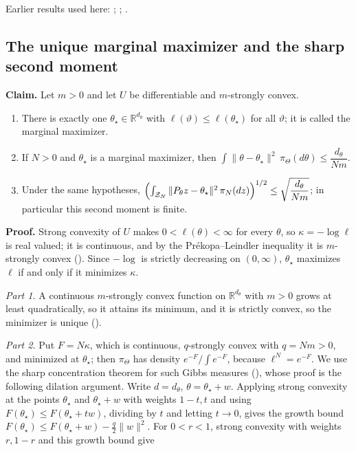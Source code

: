 \documentclass[11pt,a4paper]{report}
\begin{document}
Earlier results used here: \cite[Section~3.1.1]{LangevinLean2026IPLA}; \cite[Section~3.1.6]{LangevinLean2026IPLA}; \cite[Section~3.9.9]{LangevinLean2026IPLA}.
\subsection{\texorpdfstring{The unique marginal maximizer and the sharp second moment}{The unique marginal maximizer and the sharp second moment}}
\label{report-step-KIPLMC-Target-lean-4}


\textbf{Claim.} Let \(m>0\) and let \(U\) be differentiable and \(m\)-strongly convex.



\begin{enumerate}


\item There is exactly one \(\theta_\star\in\mathbb R^{d_\theta}\) with \(\ell(\vartheta)\le\ell(\theta_\star)\) for all \(\vartheta\); it is called the marginal maximizer.

\item If \(N>0\) and \(\theta_\star\) is a marginal maximizer, then \(\int\|\theta-\theta_\star\|^2\,\pi_\Theta(d\theta)\le\dfrac{d_\theta}{Nm}\).

\item Under the same hypotheses, \(\Bigl(\int_{\mathcal Z_N}\|P_\theta z-\theta_\star\|^2\,\pi_N(dz)\Bigr)^{1/2}\le\sqrt{\dfrac{d_\theta}{Nm}}\); in particular this second moment is finite.

\end{enumerate}



\textbf{Proof.} Strong convexity of \(U\) makes \(0<\ell(\theta)<\infty\) for every \(\theta\), so \(\kappa=-\log\ell\) is real valued; it is continuous, and by the Prékopa–Leindler inequality it is \(m\)-strongly convex (\cite[Section~3.12.3]{LangevinLean2026IPLA}). Since \(-\log\) is strictly decreasing on \((0,\infty)\), \(\theta_\star\) maximizes \(\ell\) if and only if it minimizes \(\kappa\).




\emph{Part 1.} A continuous \(m\)-strongly convex function on \(\mathbb R^{d_\theta}\) with \(m>0\) grows at least quadratically, so it attains its minimum, and it is strictly convex, so the minimizer is unique (\cite[Section~3.12.4]{LangevinLean2026IPLA}).




\emph{Part 2.} Put \(F=N\kappa\), which is continuous, \(q\)-strongly convex with \(q=Nm>0\), and minimized at \(\theta_\star\); then \(\pi_\Theta\) has density \(e^{-F}/\int e^{-F}\), because \(\ell^N=e^{-F}\). We use the sharp concentration theorem for such Gibbs measures (\cite[Section~3.5.2]{LangevinLean2026Proximal}), whose proof is the following dilation argument. Write \(d=d_\theta\), \(\theta=\theta_\star+w\). Applying strong convexity at the points \(\theta_\star\) and \(\theta_\star+w\) with weights \(1-t,t\) and using \(F(\theta_\star)\le F(\theta_\star+tw)\), dividing by \(t\) and letting \(t\to0\), gives the growth bound \(F(\theta_\star)\le F(\theta_\star+w)-\frac q2\|w\|^2\). For \(0<r<1\), strong convexity with weights \(r,1-r\) and this growth bound give
\end{document}
